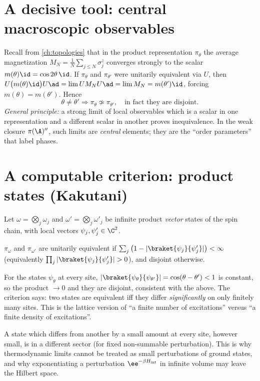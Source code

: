\section{A decisive tool: central macroscopic observables}

Recall from \cref{ch:topologies} that in the product representation $\pi_\theta$ the average magnetization $M_N=\frac1N\sum_{j\le N}\sigma^z_j$ converges strongly to the scalar $m(\theta)\id=\cos2\theta\,\id$. If $\pi_\theta$ and $\pi_{\theta'}$ were unitarily equivalent via $U$, then $U\big(m(\theta)\id\big)U\ad=\lim UM_NU\ad=\lim M_N=m(\theta')\id$, forcing $m(\theta)=m(\theta')$. Hence
\begin{equation}
\theta\ne\theta'\Longrightarrow\pi_\theta\not\simeq\pi_{\theta'},\quad\text{in fact they are disjoint.}
\end{equation}
\emph{General principle:} a strong limit of local observables which is a scalar in one representation and a different scalar in another proves inequivalence. In the weak closure $\pi(\A)''$, such limits are \emph{central} elements; they are the ``order parameters'' that label phases.

\section{A computable criterion: product states (Kakutani)}

Let $\omega=\bigotimes_j\omega_j$ and $\omega'=\bigotimes_j\omega'_j$ be infinite product \emph{vector} states of the spin chain, with local vectors $\psi_j,\psi_j'\in\C^2$.

\begin{theorem}[Kakutani]
$\pi_\omega$ and $\pi_{\omega'}$ are unitarily equivalent if $\sum_j\big(1-|\braket{\psi_j}{\psi_j'}|\big)<\infty$ (equivalently $\prod_j|\braket{\psi_j}{\psi'_j}|>0$), and disjoint otherwise.
\end{theorem}
For the states $\psi_\theta$ at every site, $|\braket{\psi_\theta}{\psi_{\theta'}}|=\cos(\theta-\theta')<1$ is constant, so the product $\to0$ and they are disjoint, consistent with the above. The criterion says: two states are equivalent iff they differ \emph{significantly} on only finitely many sites. This is the lattice version of ``a finite number of excitations'' versus ``a finite density of excitations''.

\begin{whatwrong}
A state which differs from another by a small amount at every site, however small, is in a different sector (for fixed non-summable perturbation). This is why thermodynamic limits cannot be treated as small perturbations of ground states, and why exponentiating a perturbation $\ee^{-\beta H_{\rm int}}$ in infinite volume may leave the Hilbert space.
\end{whatwrong}

